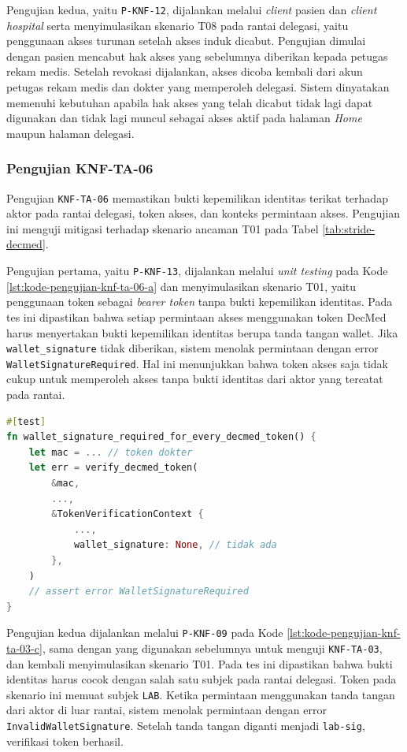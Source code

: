 \documentclass[bahasa, 12pt, a4paper, onecolumn, oneside, final]{report}
\begin{document}
Pengujian kedua, yaitu \texttt{P-KNF-12}, dijalankan melalui \textit{client} pasien dan \textit{client hospital} serta menyimulasikan skenario T08 pada rantai delegasi, yaitu penggunaan akses turunan setelah akses induk dicabut. Pengujian dimulai dengan pasien mencabut hak akses yang sebelumnya diberikan kepada petugas rekam medis. Setelah revokasi dijalankan, akses dicoba kembali dari akun petugas rekam medis dan dokter yang memperoleh delegasi. Sistem dinyatakan memenuhi kebutuhan apabila hak akses yang telah dicabut tidak lagi dapat digunakan dan tidak lagi muncul sebagai akses aktif pada halaman \textit{Home} maupun halaman delegasi.

\subsubsection{Pengujian KNF-TA-06}
\label{subsubsec:pengujian-knf-ta-06}

Pengujian \texttt{KNF-TA-06} memastikan bukti kepemilikan identitas terikat terhadap aktor pada rantai delegasi, token akses, dan konteks permintaan akses. Pengujian ini menguji mitigasi terhadap skenario ancaman T01 pada Tabel \ref{tab:stride-decmed}.

Pengujian pertama, yaitu \texttt{P-KNF-13}, dijalankan melalui \textit{unit testing} pada Kode \ref{lst:kode-pengujian-knf-ta-06-a} dan menyimulasikan skenario T01, yaitu penggunaan token sebagai \textit{bearer token} tanpa bukti kepemilikan identitas. Pada tes ini dipastikan bahwa setiap permintaan akses menggunakan token DecMed harus menyertakan bukti kepemilikan identitas berupa tanda tangan wallet. Jika \texttt{wallet\_signature} tidak diberikan, sistem menolak permintaan dengan error \texttt{WalletSignatureRequired}. Hal ini menunjukkan bahwa token akses saja tidak cukup untuk memperoleh akses tanpa bukti identitas dari aktor yang tercatat pada rantai.

\begin{lstlisting}[language=Rust, caption=Pengujian P-KNF-13 untuk KNF-TA-06, label=lst:kode-pengujian-knf-ta-06-a]
#[test]
fn wallet_signature_required_for_every_decmed_token() {
    let mac = ... // token dokter 
    let err = verify_decmed_token(
        &mac,
        ...,
        &TokenVerificationContext {
			...,
            wallet_signature: None, // tidak ada
        },
    )
    // assert error WalletSignatureRequired
}
\end{lstlisting}

Pengujian kedua dijalankan melalui \texttt{P-KNF-09} pada Kode \ref{lst:kode-pengujian-knf-ta-03-c}, sama dengan yang digunakan sebelumnya untuk menguji \texttt{KNF-TA-03}, dan kembali menyimulasikan skenario T01. Pada tes ini dipastikan bahwa bukti identitas harus cocok dengan salah satu subjek pada rantai delegasi. Token pada skenario ini memuat subjek \texttt{LAB}. Ketika permintaan menggunakan tanda tangan dari aktor di luar rantai, sistem menolak permintaan dengan error \texttt{InvalidWalletSignature}. Setelah tanda tangan diganti menjadi \texttt{lab-sig}, verifikasi token berhasil.
\end{document}
